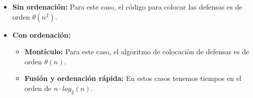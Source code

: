 \begin{itemize}
	\item \textbf{Sin ordenación:} Para este caso, el código para colocar las defensas es de orden $\theta(n^2)$.
	\item \textbf{Con ordenación:}
	\begin{itemize}
		\item \textbf{Montículo:} Para este caso, el algoritmo de colocación de defensas es de orden $\theta(n)$.
		\item \textbf{Fusión y ordenación rápida:} En estos casos tenemos tiempos en el orden de  $n\cdot log_{2}(n)$.
	\end{itemize}
\end{itemize}

